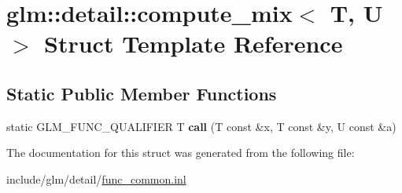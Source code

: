 \hypertarget{structglm_1_1detail_1_1compute__mix}{}\section{glm\+:\+:detail\+:\+:compute\+\_\+mix$<$ T, U $>$ Struct Template Reference}
\label{structglm_1_1detail_1_1compute__mix}
\subsection*{Static Public Member Functions}
\begin{DoxyCompactItemize}
\item 
\mbox{\label{structglm_1_1detail_1_1compute__mix_a13fd963d8385f36486509a48fd68da1c}} 
static G\+L\+M\+\_\+\+F\+U\+N\+C\+\_\+\+Q\+U\+A\+L\+I\+F\+I\+ER T {\bfseries call} (T const \&x, T const \&y, U const \&a)
\end{DoxyCompactItemize}


The documentation for this struct was generated from the following file\+:\begin{DoxyCompactItemize}
\item 
include/glm/detail/\hyperlink{func__common_8inl}{func\+\_\+common.\+inl}\end{DoxyCompactItemize}
